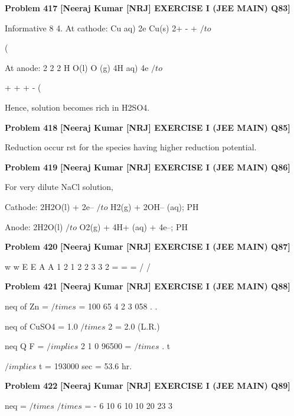 \begin{problembox}
\textbf{Problem 417} \hfill \textbf{[Neeraj Kumar [NRJ] EXERCISE I (JEE MAIN) Q83]}
\label{q:ext-nrj_all_questions-417}

Informative
8 4. At cathode: Cu
aq)
2e
Cu(s)
2+
-
+
 $/to$
 
(
 
 At anode: 2
2
2
H O(l)
O (g)
4H
aq)
4e
 $/to$
 
+
+
+
-
(
 
 
 Hence, solution becomes rich in H2SO4.
\end{problembox}

\begin{problembox}
\textbf{Problem 418} \hfill \textbf{[Neeraj Kumar [NRJ] EXERCISE I (JEE MAIN) Q85]}
\label{q:ext-nrj_all_questions-418}

Reduction occur   rst for the species having higher 
reduction potential.
\end{problembox}

\begin{problembox}
\textbf{Problem 419} \hfill \textbf{[Neeraj Kumar [NRJ] EXERCISE I (JEE MAIN) Q86]}
\label{q:ext-nrj_all_questions-419}

For very dilute NaCl solution,
 
 Cathode: 2H2O(l) + 2e-- $/to$ H2(g) + 2OH-- (aq); PH  
 
 Anode:   2H2O(l) $/to$ O2(g) + 4H+ (aq) + 4e--; PH  
\end{problembox}

\begin{problembox}
\textbf{Problem 420} \hfill \textbf{[Neeraj Kumar [NRJ] EXERCISE I (JEE MAIN) Q87]}
\label{q:ext-nrj_all_questions-420}

w
w
E
E
A
A
1
2
1
2
2
3
3
2
=
=
=
/
/
\end{problembox}

\begin{problembox}
\textbf{Problem 421} \hfill \textbf{[Neeraj Kumar [NRJ] EXERCISE I (JEE MAIN) Q88]}
\label{q:ext-nrj_all_questions-421}

neq of Zn =
$/times$
=
100
65 4
2
3 058
.
.
 
 
 neq of CuSO4 = 1.0 $/times$ 2 = 2.0 (L.R.)
 
 
 neq
Q
F
=
 $/implies$ 2
1 0
96500
=
$/times$
.
t 
 
 $/implies$ t = 193000 sec = 53.6 hr.
\end{problembox}

\begin{problembox}
\textbf{Problem 422} \hfill \textbf{[Neeraj Kumar [NRJ] EXERCISE I (JEE MAIN) Q89]}
\label{q:ext-nrj_all_questions-422}

neq =
$/times$
$/times$
=
-
6
10
6
10
10
20
23
3
\end{problembox}

